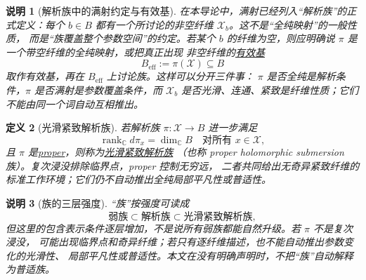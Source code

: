 \documentclass[UTF8,fontset=none,a4paper,11pt]{ctexart}
\theoremstyle{foundation-definition}
\newtheorem{definition}{定义}[section]
\theoremstyle{foundation-theorem}
\theoremstyle{foundation-proposition}
\theoremstyle{foundation-example}
\theoremstyle{foundation-remark}
\newtheorem{remark}[definition]{说明}
\theoremstyle{foundation-theorem}
\newcommand{\term}[2]{\hyperref[#1]{#2}}
\begin{document}
\begin{remark}[解析族中的满射约定与有效基]\label{rem:analytic-family-surjectivity}
在本导论中，满射已经列入“解析族”的正式定义：每个
\(b\in B\) 都有一个所讨论的非空纤维 \(\mathcal X_b\)。这不是“全纯映射”的一般性质，
而是“族覆盖整个参数空间”的约定。若某个
\(b\) 的纤维为空，则应明确说 \(\pi\) 是一个带空纤维的全纯映射，或把真正出现
非空纤维的\term{rem:analytic-family-surjectivity}{有效基}
\[
B_{\mathrm{eff}}:=\pi(\mathcal X)\subseteq B
\]
取作有效基，再在 \(B_{\mathrm{eff}}\) 上讨论族。这样可以分开三件事：
\(\pi\) 是否全纯是解析条件，\(\pi\) 是否满射是参数覆盖条件，而
\(\mathcal X_b\) 是否光滑、连通、紧致是纤维性质；它们不能由同一个词自动互相推出。
\end{remark}

\begin{definition}[光滑紧致解析族]\label{def:smooth-compact-analytic-family}
若解析族 \(\pi:\mathcal X\to B\) 进一步满足
\[
\operatorname{rank}_{\mathbb C}d\pi_x=\dim_{\mathbb C}B
\quad\text{对所有 }x\in\mathcal X,
\]
且 \(\pi\) 是\term{def:proper-map}{proper}，则称为\term{def:smooth-compact-analytic-family}{光滑紧致解析族}
（也称 proper holomorphic submersion 族）。复次浸没排除临界点，proper 控制无穷远，
二者共同给出无奇异紧致纤维的标准工作环境；它们仍不自动推出全纯局部平凡性或普适性。
\end{definition}

\begin{remark}[族的三层强度]\label{rem:family-strengths}
“族”按强度可读成
\[
\text{弱族}\subset\text{解析族}\subset\text{光滑紧致解析族},
\]
但这里的包含表示条件逐层增加，不是说所有弱族都能自然升级。若 \(\pi\) 不是复次浸没，
可能出现临界点和奇异纤维；若只有逐纤维描述，也不能自动推出参数变化的光滑性、
局部平凡性或普适性。本文在没有明确声明时，不把“族”自动解释为普适族。
\end{remark}
\end{document}
